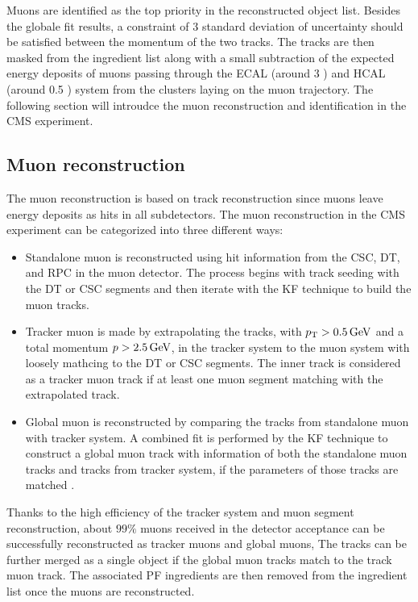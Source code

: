 Muons are identified as the top priority in the reconstructed object list.
Besides the globale fit results, a constraint of 3 standard deviation of uncertainty should be satisfied between the momentum of the two tracks.
The tracks are then masked from the ingredient list along with a small subtraction of the expected energy deposits of muons passing through the ECAL (around 3 \GeV) and HCAL (around 0.5 \GeV) system from the clusters laying on the muon trajectory.
The following section will introudce the muon reconstruction and identification in the CMS experiment.

\subsection{Muon reconstruction}
The muon reconstruction is based on track reconstruction since muons leave energy deposits as hits in all subdetectors.
The muon reconstruction in the CMS experiment can be categorized into three different ways:

\begin{itemize}
    \item Standalone muon is reconstructed using hit information from the CSC, DT, and RPC in the muon detector.
        The process begins with track seeding with the DT or CSC segments and then iterate with the KF technique to build the muon tracks.
    \item Tracker muon is made by extrapolating the tracks, with $p_{\mathrm{T}} > 0.5 \,\text{Ge\hspace{-.08em}V}$ and a total momentum $p > 2.5 \,\text{Ge\hspace{-.08em}V}$, in the tracker system to the muon system with loosely mathcing to the DT or CSC segments.
        The inner track is considered as a tracker muon track if at least one muon segment matching with the extrapolated track.
    \item Global muon is reconstructed by comparing the tracks from standalone muon with tracker system.
        A combined fit is performed by the KF technique to construct a global muon track with information of both the standalone muon tracks and tracks from tracker system, if the parameters of those tracks are matched .
\end{itemize}

Thanks to the high efficiency of the tracker system and muon segment reconstruction, about $99\%$ muons received in the detector acceptance can be successfully reconstructed as tracker muons and global muons,
The tracks can be further merged as a single object if the global muon tracks match to the track muon track.
The associated PF ingredients are then removed from the ingredient list once the muons are reconstructed.

